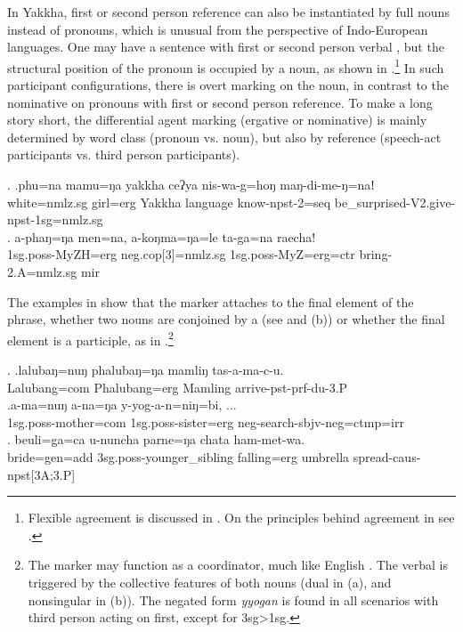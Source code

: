 	
In Yakkha, first or second person reference can also be instantiated by full nouns instead of pronouns, which is unusual from the perspective of Indo-European languages. One may have a sentence with first or second person verbal , but the structural position of the pronoun is occupied by a noun, as shown in \Next.\footnote{Flexible agreement is discussed in . On the principles behind agreement in  see  \citet{Bickel2000On-the-syntax}.} In such participant configurations, there is overt  marking on the noun, in contrast to the nominative on pronouns with first or second person reference. To make a long story short, the differential agent marking (ergative or nominative) is mainly determined  by word class (pronoun vs. noun), but also by reference (speech-act participants vs. third person participants).
	
	\ex. \ag.phu=na mamu=ŋa yakkha ceʔya nis-wa-g=hoŋ maŋ-di-me-ŋ=naǃ\\
	white{\sc =nmlz.sg} girl{\sc =erg} Yakkha language know{\sc -npst-2=seq}  be\_surprised{\sc -V2.give-npst-1sg=nmlz.sg}\\
	\bg. a-phaŋ=ŋa men=na, a-koŋma=ŋa=le   ta-ga=na           raecha!\\
		{\sc 1sg.poss-}MyZH{\sc =erg}  {\sc  neg.cop[3]=nmlz.sg} {\sc 1sg.poss-}MyZ{\sc =erg=ctr} bring{\sc [pst;3.P]-2.A=nmlz.sg} {\sc mir}\\
		 

The examples in  \Next show that the  marker attaches to the final element of the phrase,  whether two nouns are conjoined by a  (see \Next[a] and (b)) or whether the final element is a participle, as in \Next[c].\footnote{The  marker may function as a coordinator, much like English . The verbal  is triggered by the collective  features of both nouns (dual in (a), and nonsingular in (b)). The negated form \emph{yyogan} is found in all scenarios with third person acting on first, except for {\sc 3sg>1sg}.}
	
	\ex. \ag.lalubaŋ=nuŋ   phalubaŋ=ŋa   mamliŋ   tas-a-ma-c-u.\\
	Lalubang{\sc =com} Phalubang{\sc =erg} Mamling arrive{\sc -pst-prf-du-3.P}\\
	\bg.a-ma=nuŋ  a-na=ŋa  y-yog-a-n=niŋ=bi, ...\\
	{\sc 1sg.poss-}mother{\sc =com} {\sc 1sg.poss-}sister{\sc =erg} {\sc neg-}search{\sc [3A;1.P]-sbjv-neg=ctmp=irr}\\
	\bg.   beuli=ga=ca  u-nuncha parne=ŋa    chata    ham-met-wa.\\
	bride{\sc =gen=add} {\sc 3sg.poss-}younger\_sibling  falling{\sc =erg} umbrella spread{\sc -caus-npst[3A;3.P]}\\

